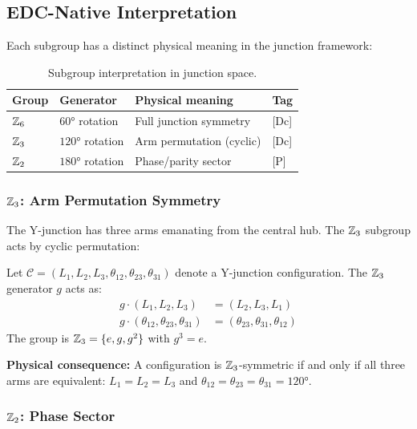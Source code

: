 \subsection{EDC-Native Interpretation}

Each subgroup has a distinct physical meaning in the junction framework:

\begin{table}[htbp]
\centering
\caption{Subgroup interpretation in junction space.}
\label{tab:subgroup_interpret}
\begin{tabular}{llll}
    \toprule
    \textbf{Group} & \textbf{Generator} & \textbf{Physical meaning} & \textbf{Tag} \\
    \midrule
    $\mathbb{Z}_6$ & $60°$ rotation & Full junction symmetry & [Dc] \\
    $\Zthree$ & $120°$ rotation & Arm permutation (cyclic) & [Dc] \\
    $\mathbb{Z}_2$ & $180°$ rotation & Phase/parity sector & [P] \\
    \bottomrule
\end{tabular}
\end{table}

\subsubsection{$\Zthree$: Arm Permutation Symmetry}

The Y-junction has three arms emanating from the central hub. The $\Zthree$
subgroup acts by cyclic permutation:

\begin{derivationbox}[title=$\Zthree$ Action on Configurations]
    Let $\mathcal{C} = (L_1, L_2, L_3, \theta_{12}, \theta_{23}, \theta_{31})$
    denote a Y-junction configuration. The $\Zthree$ generator $g$ acts as:
    \begin{align}
        g \cdot (L_1, L_2, L_3) &= (L_2, L_3, L_1) \\
        g \cdot (\theta_{12}, \theta_{23}, \theta_{31}) &= (\theta_{23}, \theta_{31}, \theta_{12})
    \end{align}
    The group is $\mathbb{Z}_3 = \{e, g, g^2\}$ with $g^3 = e$. \tagDc
\end{derivationbox}

\textbf{Physical consequence:} A configuration is $\Zthree$-symmetric if and
only if all three arms are equivalent: $L_1 = L_2 = L_3$ and
$\theta_{12} = \theta_{23} = \theta_{31} = 120°$.

\subsubsection{$\mathbb{Z}_2$: Phase Sector}

